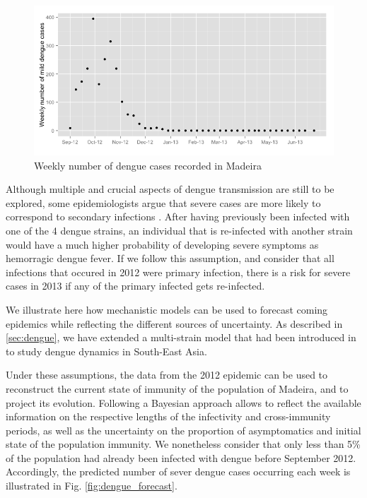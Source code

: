 \documentclass[a4paper,11pt,titlepage]{article}
\theoremstyle{plain} %
\begin{document}
\begin{figure}[h]
\begin{centering}
\includegraphics[scale=0.5]{Dengue_data.png}
\par\end{centering}
\caption{\label{fig:dengue_data}Weekly number of dengue cases recorded in Madeira}
\end{figure}



Although multiple and crucial aspects of dengue transmission are still to be explored, some epidemiologists argue that
severe cases are more likely to correspond to secondary infections \citep{Ranjit2011}. After having previously been infected with one of
the 4 dengue strains, an individual that is re-infected with another strain would have a much higher probability of developing 
severe symptoms as hemorragic dengue fever. If we follow this assumption, and consider that all infections that occured
in 2012 were primary infection, there is a risk for severe cases in 2013 if any of the primary infected gets re-infected.


We illustrate here how mechanistic models can be used to forecast coming epidemics while reflecting the different sources of uncertainty. As described in \ref{sec:dengue}, we have extended a multi-strain model that had been introduced in \cite{Aguiar2011} to study dengue dynamics in South-East Asia.

Under these assumptions, the data from the 2012 epidemic can be used to reconstruct the current state of immunity of 
the population of Madeira, and to project its evolution. Following a Bayesian approach allows to reflect the 
available information on the respective lengths of the infectivity and cross-immunity periods, as well as the uncertainty 
on the proportion of asymptomatics and initial state of the population immunity. We nonetheless consider that only less
than 5\% of the population had already been infected with dengue before September 2012. Accordingly, the predicted number of sever dengue cases occurring each week is illustrated in Fig. \ref{fig:dengue_forecast}.
\end{document}
